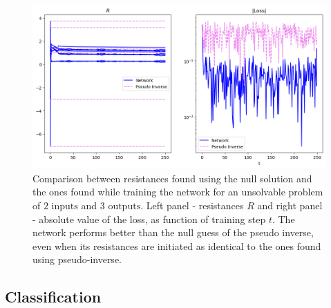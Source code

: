 \documentclass[%
 reprint,
 amsmath,amssymb,
 aps,
]{revtex4-2}
\begin{document}
    \begin{figure}[ht]
    \centerline{
    \includegraphics[width=\columnwidth]{Figures/pseudo_vs_network_comparison.png}
    }
    \caption{Comparison between resistances found using the null solution and the ones found while training the network for an unsolvable problem of $2\text{ inputs}$ and $3\text{ outputs}$. Left panel - resistances $R$ and right panel - absolute value of the loss, as function of training step $t$. The network performs better than the null guess of the pseudo inverse, even when its resistances are initiated as identical to the ones found using pseudo-inverse.}
    \label{fig:pseudo_vs_network_comparison}
    \end{figure}

\subsection{Classification}\label{sec:Classification}
\end{document}
